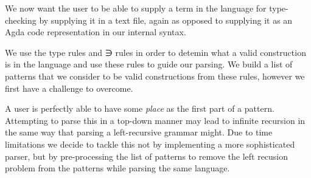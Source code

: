 {\begin{code}
\AgdaSymbol{)}\<%
\\
\>[0]\AgdaSpace{}%
\AgdaSpace{}%
\AgdaSpace{}%
\AgdaSpace{}%
\AgdaSymbol{(}\AgdaSymbol{;}\AgdaSpace{}%
\AgdaSymbol{;}\AgdaSpace{}%
\AgdaSymbol{)}\<%
\\
\>[0]\AgdaSpace{}%
\AgdaSpace{}%
\AgdaSpace{}%
\AgdaSymbol{(}\AgdaSpace{}%
\AgdaSpace{}%
\AgdaSymbol{)}\<%
\\
\>[0]\AgdaSpace{}%
\AgdaSpace{}%
\AgdaSpace{}%
\AgdaSymbol{(}\AgdaSpace{}%
\AgdaSpace{}%
\AgdaSymbol{)}\<%
\\
\>[0]\AgdaSpace{}%
\AgdaSpace{}%
\AgdaSpace{}%
\AgdaSymbol{(}\AgdaSymbol{)}\<%
\\
\>[0]\AgdaSpace{}%
\AgdaSpace{}%
\AgdaSpace{}%
\AgdaSpace{}%
\AgdaSymbol{(}\AgdaSymbol{;}\AgdaSpace{}%
\AgdaSymbol{)}\<%
\end{code}
}
We now want the user to be able to supply a term in the language for type-checking
by supplying it in a text file, again as opposed to supplying it as an Agda code
representation in our internal syntax.

We use the type rules and ∋ rules in order to detemin what a valid construction
is in the language and use these rules to guide our parsing. We build a list of
patterns that we consider to be valid constructions from these rules, however we
first have a challenge to overcome.

A user is perfectly able to have some \emph{place} as the first part of a pattern.
Attempting to parse this in a top-down manner may lead to infinite recursion in
the same way that parsing a left-recursive grammar might. Due to time limitations
we decide to tackle this not by implementing a more sophisticated parser, but by
pre-processing the list of patterns to remove the left recusion problem from the
patterns while parsing the same language.

